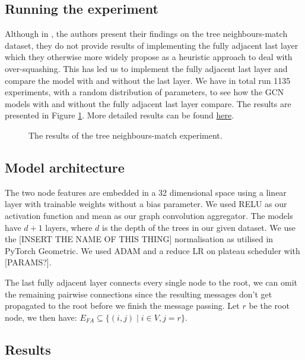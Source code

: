 \documentclass[a4paper,12pt]{article}
\begin{document}
\subsection{Running the experiment} %

Although in \cite{alon_bottleneck_2021}, the authors present their findings on the tree neighbours-match dataset, they do not provide results of implementing the fully adjacent last layer which they otherwise more widely propose as a heuristic approach to deal with over-squashing.
This has led us to implement the fully adjacent last layer and compare the model with and without the last layer. We have in total run 1135 experiments, with a random distribution of parameters, to see how the GCN models with and without the fully adjacent last layer compare. The results are presented in Figure \ref{fig:tree_experiment_graph}. More detailed results can be found \href{PLACE SOMETHING HERE MAYBE A LINK TO THE RESULTS IN THE}{here}.

\begin{figure}[H]
  \centering
  
  \caption{The results of the tree neighbours-match experiment.}
  \label{fig:tree_experiment_graph}
\end{figure}

\subsection{Model architecture} %

The two node features are embedded in a 32 dimensional space using a linear layer with trainable weights without a bias parameter. We used RELU as our activation function and mean as our graph convolution aggregator. The models have \(d+1\) layers, where \(d\) is the depth of the trees in our given dataset.
We use the [INSERT THE NAME OF THIS THING] normalisation as utilised in PyTorch Geometric. We used ADAM and a reduce LR on plateau scheduler with [PARAMS?].

The last fully adjacent layer connects every single node to the root, we can omit the remaining pairwise connections since the resulting messages don't get propagated to the root before we finish the message passing. Let \(r\) be the root node, we then have: \(E_{FA} \subseteq \{(i, j) \mid i \in V, j = r\}\).

\subsection{Results} %
\end{document}
